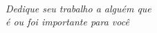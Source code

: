 \

\vfill

\begin{flushright}
\hfill \textit{   Dedique seu trabalho a alguém que\\ é ou foi importante para você }
\end{flushright}

\vspace*{1cm} 
